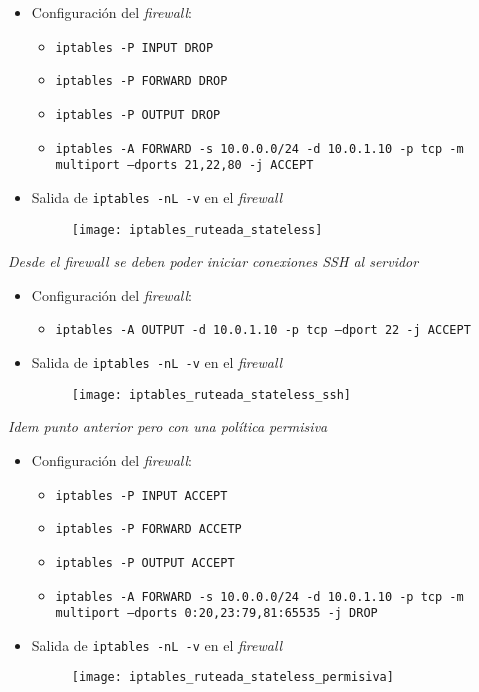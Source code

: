 \begin{itemize}
    \item Configuración del \emph{firewall}:
    \begin{itemize}
        \item \texttt{iptables -P INPUT DROP} 
        \item \texttt{iptables -P FORWARD DROP} 
        \item \texttt{iptables -P OUTPUT DROP} 
        \item \texttt{iptables -A FORWARD -s 10.0.0.0/24 -d 10.0.1.10 -p tcp -m multiport --dports 21,22,80 -j ACCEPT} 
    \end{itemize}
    \item Salida de \texttt{iptables -nL -v} en el \emph{firewall} 
    \begin{figure}[H]
        \centering
        \texttt{[image: iptables\_ruteada\_stateless]}
    \end{figure}
\end{itemize}

\emph{Desde el firewall se deben poder iniciar conexiones SSH al servidor} 
~\\

\begin{itemize}
    \item Configuración del \emph{firewall}:
    \begin{itemize}
        \item \texttt{iptables -A OUTPUT -d 10.0.1.10 -p tcp --dport 22 -j ACCEPT} 
    \end{itemize}
    \item Salida de \texttt{iptables -nL -v} en el \emph{firewall} 
    \begin{figure}[H]
        \centering
        \texttt{[image: iptables\_ruteada\_stateless\_ssh]}
    \end{figure}
\end{itemize}

\emph{Idem punto anterior pero con una política permisiva} 
~\\

\begin{itemize}
    \item Configuración del \emph{firewall}:
    \begin{itemize}
        \item \texttt{iptables -P INPUT ACCEPT} 
        \item \texttt{iptables -P FORWARD ACCETP} 
        \item \texttt{iptables -P OUTPUT ACCEPT} 
        \item \texttt{iptables -A FORWARD -s 10.0.0.0/24 -d 10.0.1.10 -p tcp -m multiport --dports 0:20,23:79,81:65535 -j DROP} 
    \end{itemize}
    \item Salida de \texttt{iptables -nL -v} en el \emph{firewall} 
    \begin{figure}[H]
        \centering
        \texttt{[image: iptables\_ruteada\_stateless\_permisiva]}
    \end{figure}
\end{itemize}

